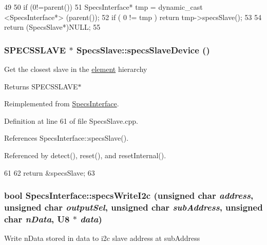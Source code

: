 \begin{DoxyCode}
49                                       {
50     if (0!=parent()){
51     SpecsInterface* tmp = dynamic_cast <SpecsInterface*> (parent());
52     if ( 0 != tmp ) return tmp->specsSlave();
53   }
54   return (SpecsSlave*)NULL; 
55 }
\end{DoxyCode}
\hypertarget{classSpecsSlave_a44970aca61b6fdcd6d6d90e6601093f3}{
\subsubsection[{specsSlaveDevice}]{\setlength{\rightskip}{0pt plus 5cm}SPECSSLAVE $\ast$ SpecsSlave::specsSlaveDevice ()}}
\label{classSpecsSlave_a44970aca61b6fdcd6d6d90e6601093f3}
Get the closest slave in the \hyperlink{namespaceelement}{element} hierarchy \begin{DoxyReturn}{Returns}
SPECSSLAVE$\ast$ 
\end{DoxyReturn}


Reimplemented from \hyperlink{classSpecsInterface_ac8d4711197f484f055533ec1e5ae01a1}{SpecsInterface}.

Definition at line 61 of file SpecsSlave.cpp.

References SpecsInterface::specsSlave().

Referenced by detect(), reset(), and resetInternal().


\begin{DoxyCode}
61                                         {
62   return &specsSlave;
63 }
\end{DoxyCode}
\hypertarget{classSpecsInterface_ae208595624e222a9ff81d112dfbf5a97}{
\subsubsection[{specsWriteI2c}]{\setlength{\rightskip}{0pt plus 5cm}bool SpecsInterface::specsWriteI2c (unsigned char {\em address}, \/  unsigned char {\em outputSel}, \/  unsigned char {\em subAddress}, \/  unsigned char {\em nData}, \/  {\bf U8} $\ast$ {\em data})}}
\label{classSpecsInterface_ae208595624e222a9ff81d112dfbf5a97}
Write nData stored in data to i2c slave address at subAddress

